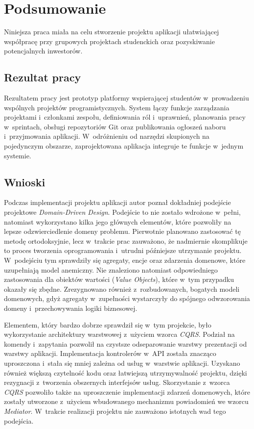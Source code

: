 \chapter{Podsumowanie}
\label{chap:podsumowanie}
Niniejsza praca miała na celu stworzenie projektu aplikacji ułatwiającej współpracę przy grupowych projektach studenckich oraz pozyskiwanie potencjalnych inwestorów.

\section{Rezultat pracy}
Rezultatem pracy jest prototyp platformy wspierającej studentów w~prowadzeniu wspólnych projektów programistycznych. 
System łączy funkcje zarządzania projektami i~członkami zespołu, definiowania ról i~uprawnień, planowania pracy w~sprintach, obsługi repozytoriów Git oraz publikowania ogłoszeń naboru i~przyjmowania aplikacji. W~odróżnieniu od narzędzi skupionych na pojedynczym obszarze, zaprojektowana aplikacja integruje te funkcje w~jednym systemie.

\section{Wnioski}
Podczas implementacji projektu aplikacji autor poznał dokładniej podejście projektowe \textit{Domain-Driven Design}. Podejście to nie zostało wdrożone w~pełni, natomiast wykorzystano kilka jego głównych elementów, które pozwoliły na lepsze odzwierciedlenie domeny problemu. Pierwotnie planowano zastosować tę metodę ortodoksyjnie, lecz w~trakcie prac zauważono, że nadmiernie skomplikuje to proces tworzenia oprogramowania i~utrudni późniejsze utrzymanie projektu. W~podejściu tym sprawdziły się agregaty, encje oraz zdarzenia domenowe, które uzupełniają model anemiczny. Nie znaleziono natomiast odpowiedniego zastosowania dla obiektów wartości (\textit{Value Objects}), które w~tym przypadku okazały się zbędne. Zrezygnowano również z~rozbudowanych, bogatych modeli domenowych, gdyż agregaty w~zupełności wystarczyły do spójnego odwzorowania domeny i~przechowywania logiki biznesowej.

Elementem, który bardzo dobrze sprawdził się w~tym projekcie, było wykorzystanie architektury warstwowej z~użyciem wzorca \textit{CQRS}. Podział na komendy i~zapytania pozwolił na czystsze odseparowanie warstwy prezentacji od warstwy aplikacji. Implementacja kontrolerów w~API została znacząco uproszczona i~stała się mniej zależna od usług w~warstwie aplikacji. Uzyskano również większą czytelność kodu oraz łatwiejszą utrzymywalność projektu, dzięki rezygnacji z~tworzenia obszernych interfejsów usług. Skorzystanie z~wzorca \textit{CQRS} pozwoliło także na uproszczenie implementacji zdarzeń domenowych, które zostały utworzone z~użyciem wbudowanego mechanizmu powiadomień we wzorcu \textit{Mediator}. W~trakcie realizacji projektu nie zauważono istotnych wad tego podejścia.

